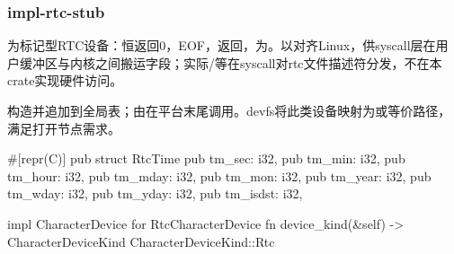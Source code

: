 
\subsubsection{impl-rtc-stub}

为标记型RTC设备：恒返回0，EOF，返回，为。以\code{\#[repr(C)]}对齐Linux，供syscall层在用户缓冲区与内核之间搬运字段；实际/等在syscall对rtc文件描述符分发，不在本crate实现硬件访问。

构造并追加到全局表；由在平台末尾调用。devfs将此类设备映射为或等价路径，满足打开节点需求。

\begin{rustcode}
#[repr(C)]
pub struct RtcTime {
    pub tm_sec: i32,
    pub tm_min: i32,
    pub tm_hour: i32,
    pub tm_mday: i32,
    pub tm_mon: i32,
    pub tm_year: i32,
    pub tm_wday: i32,
    pub tm_yday: i32,
    pub tm_isdst: i32,
}

impl CharacterDevice for RtcCharacterDevice {
    fn device_kind(&self) -> CharacterDeviceKind {
        CharacterDeviceKind::Rtc
    }
}
\end{rustcode}
